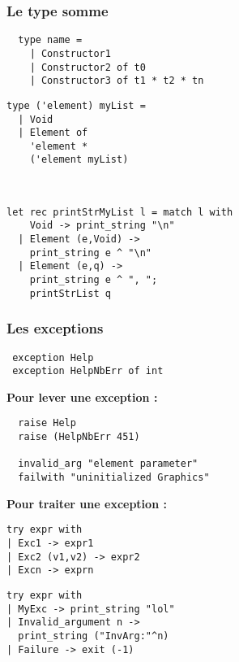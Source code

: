 \begin{frame}[fragile]
	\frametitle{Le type somme}
	\begin{lstlisting}
  type name =
    | Constructor1 
    | Constructor2 of t0 
    | Constructor3 of t1 * t2 * tn 
	\end{lstlisting}
	
	\begin{center}
		\begin{minipage}{4.3cm}
			\lstset{basicstyle=\scriptsize}
			\begin{lstlisting}
type ('element) myList =
  | Void
  | Element of 
    'element * 
    ('element myList)
			\end{lstlisting}
		\end{minipage}\\
		\begin{minipage}{7.3cm}
			\lstset{basicstyle=\scriptsize}
			\begin{lstlisting}
let rec printStrMyList l = match l with
    Void -> print_string "\n"
  | Element (e,Void) -> 
    print_string e ^ "\n"
  | Element (e,q) -> 
    print_string e ^ ", ";
    printStrList q
			\end{lstlisting}
		\end{minipage}
	\end{center}
\end{frame}

\begin{frame}[fragile]
	\frametitle{Les exceptions}
	\begin{lstlisting}
 exception Help
 exception HelpNbErr of int
	\end{lstlisting}
	\textbf{Pour lever une exception :}
	\begin{lstlisting}
  raise Help
  raise (HelpNbErr 451)
  
  invalid_arg "element parameter"
  failwith "uninitialized Graphics"
	\end{lstlisting}
	\textbf{Pour traiter une exception :}
	\begin{center}
		\begin{minipage}{4.2cm}
			\lstset{basicstyle=\scriptsize}
			\begin{lstlisting}
try expr with 
| Exc1 -> expr1
| Exc2 (v1,v2) -> expr2
| Excn -> exprn
			\end{lstlisting}
		\end{minipage}
		\begin{minipage}{5cm}
			\lstset{basicstyle=\scriptsize}
			\begin{lstlisting}
try expr with 
| MyExc -> print_string "lol"
| Invalid_argument n -> 
  print_string ("InvArg:"^n)
| Failure -> exit (-1)
			\end{lstlisting}
		\end{minipage}
	\end{center}
\end{frame}
